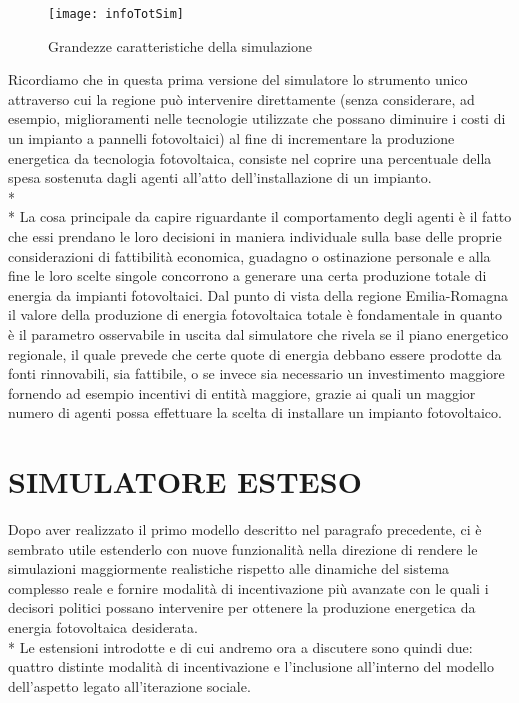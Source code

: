 \documentclass[12pt,a4paper,openright,twoside]{report}
\begin{document}
\begin{figure}[hbt]
	\centering
	\texttt{[image: infoTotSim]}
	\caption{Grandezze caratteristiche della simulazione}
	\label{infoTotSim}
\end{figure}

Ricordiamo che in questa prima versione del simulatore lo strumento unico attraverso cui la regione può intervenire direttamente (senza considerare, ad esempio, miglioramenti nelle tecnologie utilizzate che possano diminuire i costi di un impianto a pannelli fotovoltaici) al fine di incrementare la produzione energetica da tecnologia fotovoltaica, consiste nel coprire una percentuale della spesa sostenuta dagli agenti all'atto dell'installazione di un impianto.\\*\\* 
La cosa principale da capire riguardante il comportamento degli agenti è il fatto che essi prendano le loro decisioni in maniera individuale sulla base delle proprie considerazioni di fattibilità economica, guadagno o ostinazione personale e alla fine le loro scelte singole concorrono a generare una certa produzione totale di energia da impianti fotovoltaici. Dal punto di vista della regione Emilia-Romagna il valore della produzione di energia fotovoltaica totale è fondamentale in quanto è il parametro osservabile in uscita dal simulatore che rivela se il piano energetico regionale, il quale prevede che certe quote di energia debbano essere prodotte da fonti rinnovabili, sia fattibile, o se invece sia necessario un investimento maggiore fornendo ad esempio incentivi di entità maggiore, grazie ai quali un maggior numero di agenti possa effettuare la scelta di installare un impianto fotovoltaico.


\section{SIMULATORE ESTESO}

Dopo aver realizzato il primo modello descritto nel paragrafo precedente, ci è sembrato utile estenderlo con nuove funzionalità nella direzione di rendere le simulazioni maggiormente realistiche rispetto alle dinamiche del sistema complesso reale e fornire modalità di incentivazione più avanzate con le quali i decisori politici possano intervenire per ottenere la produzione energetica da energia fotovoltaica desiderata. \\* Le estensioni introdotte e di cui andremo ora a discutere sono quindi due: quattro distinte modalità di incentivazione e l'inclusione all'interno del modello dell'aspetto legato all'iterazione sociale.
\end{document}
